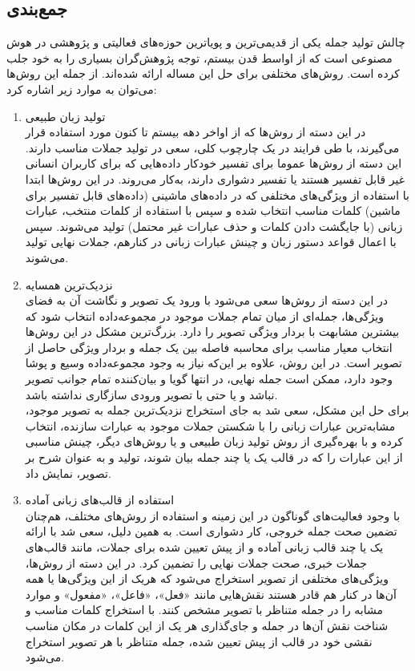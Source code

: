 \subsection{جمع‌بندی}

چالش تولید جمله یکی از قدیمی‌ترین و پویاترین حوزه‌های فعالیتی و پژوهشی در هوش مصنوعی است که از اواسط قدن بیستم، توجه پژوهش‌گران بسیاری را به خود جلب کرده است. روش‌های مختلفی برای حل این مساله ارائه شده‌اند. از جمله این روش‌ها می‌توان به موارد زیر اشاره کرد:

\begin{enumerate}
\item تولید زبان طبیعی
\\
در این دسته از روش‌ها که از اواخر دهه بیستم تا کنون مورد استفاده قرار می‌گیرند، با طی فرایند در یک چارچوب کلی، سعی در تولید جملات مناسب دارند. این دسته از روش‌ها عموما برای تفسیر خودکار داده‌هایی که برای کاربران انسانی غیر قابل تفسیر هستند یا تفسیر دشواری دارند، به‌کار می‌روند. در این روش‌ها ابتدا با استفاده از ویژگی‌های مختلفی که در داده‌های ماشینی (داده‌های قابل تفسیر برای ماشین) کلمات مناسب انتخاب شده و سپس با استفاده از کلمات منتخب، عبارات زبانی (با جایگشت دادن کلمات و حذف عبارات غیر محتمل) تولید می‌شوند. سپس با اعمال قواعد دستور زبان و چینش عبارات زبانی در کنارهم، جملات نهایی تولید می‌شوند.
\item نزدیک‌ترین همسایه
\\
در این دسته از روش‌ها سعی می‌شود با ورود یک تصویر و نگاشت آن به فضای ویژگی‌ها، جمله‌ای از میان تمام جملات موجود در مجموعه‌داده انتخاب شود که بیشترین مشابهت با بردار ویژگی تصویر را دارد. بزرگ‌ترین مشکل در این روش‌ها انتخاب معیار مناسب برای محاسبه فاصله بین یک جمله و بردار ویژگی حاصل از تصویر است. در این روش، علاوه بر این‌که نیاز به وجود مجموعه‌داده وسیع و پوشا وجود دارد، ممکن است جمله نهایی، در انتها گویا و بیان‌کننده تمام جوانب تصویر نباشد و یا حتی با تصویر ورودی سازگاری نداشته باشد.
\\
برای حل این مشکل، سعی شد به جای استخراج نزدیک‌ترین جمله به تصویر موجود، مشابه‌ترین عبارات زبانی را با شکستن جملات موجود به عبارات سازنده، انتخاب کرده و با بهره‌گیری از روش تولید زبان طبیعی و یا روش‌های دیگر، چینش مناسبی از این عبارات را که در قالب یک یا چند جمله بیان شوند، تولید و به عنوان شرح بر تصویر، نمایش داد.
\item استفاده از قالب‌های زبانی آماده
\\
با وجود فعالیت‌های گوناگون در این زمینه و استفاده از روش‌های مختلف، هم‌چنان تضمین صحت جمله خروجی، کار دشواری است. به همین دلیل، سعی شد با ارائه یک یا چند قالب زبانی آماده و از پیش تعیین شده برای جملات، مانند قالب‌های جملات خبری، صحت جملات نهایی را تضمین کرد. در این دسته از روش‌ها، ویژگی‌های مختلفی از تصویر استخراج می‌شود که هریک از این ویژگی‌ها یا همه آن‌ها در کنار هم قادر هستند نقش‌هایی مانند «فعل»، «فاعل»، «مفعول» و موارد مشابه را در جمله متناظر با تصویر مشخص کنند. با استخراج کلمات مناسب و شناخت نقش آن‌ها در جمله و جای‌گذاری هر یک از این کلمات در مکان مناسب نقشی خود در قالب از پیش تعیین شده، جمله متناظر با هر تصویر استخراج می‌شود.

\end{enumerate}
